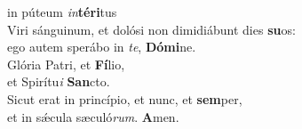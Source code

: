 \evenverse in púteum \textit{in}\textbf{té}\textbf{ri}tus\\
\oddverse Viri sánguinum, et dolósi non dimidiábunt dies \textbf{su}os:~\*\\
\oddverse ego autem sperábo in \textit{te}, \textbf{Dó}\textbf{mi}ne.\\
\evenverse Glória Patri, et \textbf{Fí}lio,~\*\\
\evenverse et Spirítu\textit{i} \textbf{San}cto.\\
\oddverse Sicut erat in princípio, et nunc, et \textbf{sem}per,~\*\\
\oddverse et in sǽcula sæculó\textit{rum}. \textbf{A}men.\\
